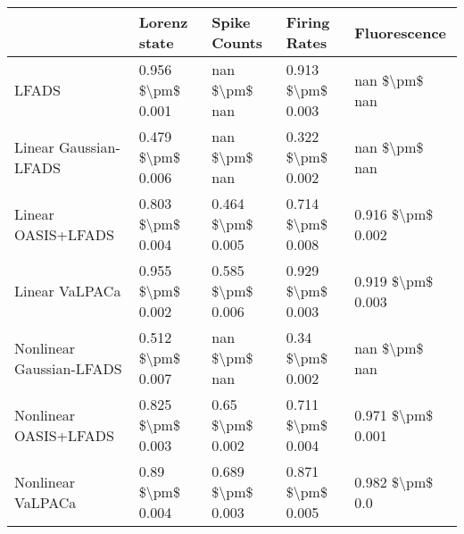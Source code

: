 \begin{tabular}{lllll}
\toprule
{} &       Lorenz state &       Spike Counts &       Firing Rates &       Fluorescence \\
\midrule
LFADS                    &  0.956 \$\textbackslash pm\$ 0.001 &      nan \$\textbackslash pm\$ nan &  0.913 \$\textbackslash pm\$ 0.003 &      nan \$\textbackslash pm\$ nan \\
Linear Gaussian-LFADS    &  0.479 \$\textbackslash pm\$ 0.006 &      nan \$\textbackslash pm\$ nan &  0.322 \$\textbackslash pm\$ 0.002 &      nan \$\textbackslash pm\$ nan \\
Linear OASIS+LFADS       &  0.803 \$\textbackslash pm\$ 0.004 &  0.464 \$\textbackslash pm\$ 0.005 &  0.714 \$\textbackslash pm\$ 0.008 &  0.916 \$\textbackslash pm\$ 0.002 \\
Linear VaLPACa           &  0.955 \$\textbackslash pm\$ 0.002 &  0.585 \$\textbackslash pm\$ 0.006 &  0.929 \$\textbackslash pm\$ 0.003 &  0.919 \$\textbackslash pm\$ 0.003 \\
Nonlinear Gaussian-LFADS &  0.512 \$\textbackslash pm\$ 0.007 &      nan \$\textbackslash pm\$ nan &   0.34 \$\textbackslash pm\$ 0.002 &      nan \$\textbackslash pm\$ nan \\
Nonlinear OASIS+LFADS    &  0.825 \$\textbackslash pm\$ 0.003 &   0.65 \$\textbackslash pm\$ 0.002 &  0.711 \$\textbackslash pm\$ 0.004 &  0.971 \$\textbackslash pm\$ 0.001 \\
Nonlinear VaLPACa        &   0.89 \$\textbackslash pm\$ 0.004 &  0.689 \$\textbackslash pm\$ 0.003 &  0.871 \$\textbackslash pm\$ 0.005 &    0.982 \$\textbackslash pm\$ 0.0 \\
\bottomrule
\end{tabular}

